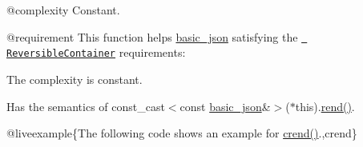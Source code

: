  @complexity Constant.

@requirement This function helps {\ttfamily \mbox{\hyperlink{classnlohmann_1_1basic__json}{basic\+\_\+json}}} satisfying the \href{http://en.cppreference.com/w/cpp/concept/ReversibleContainer}{\texttt{ Reversible\+Container}} requirements\+:
\begin{DoxyItemize}
\item The complexity is constant.
\item Has the semantics of {\ttfamily const\+\_\+cast$<$const \mbox{\hyperlink{classnlohmann_1_1basic__json}{basic\+\_\+json}}\&$>$($\ast$this).\mbox{\hyperlink{classnlohmann_1_1basic__json_ac77aed0925d447744676725ab0b6d535}{rend()}}}.
\end{DoxyItemize}

@liveexample\{The following code shows an example for {\ttfamily \mbox{\hyperlink{classnlohmann_1_1basic__json_a5795b029dbf28e0cb2c7a439ec5d0a88}{crend()}}}.,crend\}

